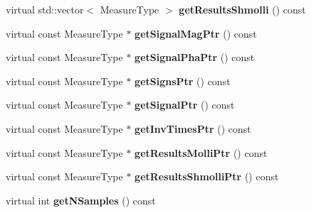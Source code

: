 \begin{DoxyCompactItemize}
\item 
\hypertarget{class_ox_1_1_test_data_aece21264e7f357c50e2d157f077127f5}{virtual std\-::vector$<$ Measure\-Type $>$ {\bfseries get\-Results\-Shmolli} () const }\label{class_ox_1_1_test_data_aece21264e7f357c50e2d157f077127f5}

\item 
\hypertarget{class_ox_1_1_test_data_a9f625acf214f62d6cdfee00c924ef9b0}{virtual const Measure\-Type $\ast$ {\bfseries get\-Signal\-Mag\-Ptr} () const }\label{class_ox_1_1_test_data_a9f625acf214f62d6cdfee00c924ef9b0}

\item 
\hypertarget{class_ox_1_1_test_data_aafe59c86537fb24e513443e34f2b506d}{virtual const Measure\-Type $\ast$ {\bfseries get\-Signal\-Pha\-Ptr} () const }\label{class_ox_1_1_test_data_aafe59c86537fb24e513443e34f2b506d}

\item 
\hypertarget{class_ox_1_1_test_data_a98127c877fabc49a7112489e928cda05}{virtual const Measure\-Type $\ast$ {\bfseries get\-Signs\-Ptr} () const }\label{class_ox_1_1_test_data_a98127c877fabc49a7112489e928cda05}

\item 
\hypertarget{class_ox_1_1_test_data_a7c52dbd7292dfafd5e9d95eb9d701e19}{virtual const Measure\-Type $\ast$ {\bfseries get\-Signal\-Ptr} () const }\label{class_ox_1_1_test_data_a7c52dbd7292dfafd5e9d95eb9d701e19}

\item 
\hypertarget{class_ox_1_1_test_data_ad6f19708661e0722df977b8dacbf88e7}{virtual const Measure\-Type $\ast$ {\bfseries get\-Inv\-Times\-Ptr} () const }\label{class_ox_1_1_test_data_ad6f19708661e0722df977b8dacbf88e7}

\item 
\hypertarget{class_ox_1_1_test_data_a1cb0dc25db322b7ba075e0ab7f5d6567}{virtual const Measure\-Type $\ast$ {\bfseries get\-Results\-Molli\-Ptr} () const }\label{class_ox_1_1_test_data_a1cb0dc25db322b7ba075e0ab7f5d6567}

\item 
\hypertarget{class_ox_1_1_test_data_ad822f6946548df6c68cf6cb007030702}{virtual const Measure\-Type $\ast$ {\bfseries get\-Results\-Shmolli\-Ptr} () const }\label{class_ox_1_1_test_data_ad822f6946548df6c68cf6cb007030702}

\item 
\hypertarget{class_ox_1_1_test_data_a93fc01cb722f3cadbaa530068c0079da}{virtual int {\bfseries get\-N\-Samples} () const }\label{class_ox_1_1_test_data_a93fc01cb722f3cadbaa530068c0079da}


\end{DoxyCompactItemize}
